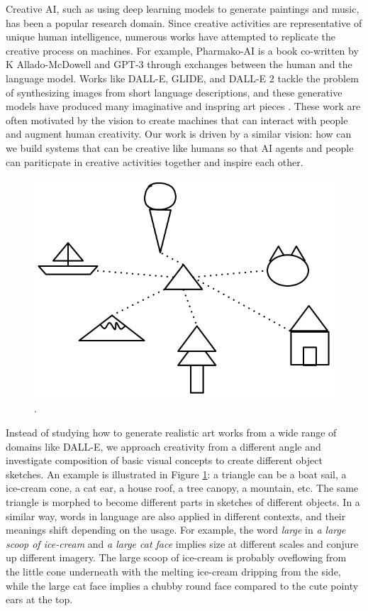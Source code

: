 Creative AI, such as using deep learning models to generate paintings and music, has been a popular research domain. Since creative activities are representative of unique human intelligence, numerous works have attempted to replicate the creative process on machines.
For example, Pharmako-AI \citep{allado-mcdowell_okojie_2020} is a book co-written by K Allado-McDowell and GPT-3 \citep{gpt3} through exchanges between the human and the language model. 
Works like DALL-E, GLIDE, and DALL-E 2 tackle the problem of synthesizing images from short language descriptions, and these generative models have produced many imaginative and inspring art pieces \citep{dallePaper,glidePaper,dalle2Paper}.
These work are often motivated by the vision to create machines that can interact with people and augment human creativity.  
Our work is driven by a similar vision: how can we build systems that can be creative like humans so that AI agents and people can pariticpate in creative activities together and inspire each other. 

\begin{figure}[!htb]
\centering
\includegraphics[width=.3\linewidth]{introduction/sketch_composition.png}  
\caption{.}
\label{introduction.composition}
\end{figure}

Instead of studying how to generate realistic art works from a wide range of domains like DALL-E, we approach creativity from a different angle and investigate composition of basic visual concepts to create different object sketches. 
An example is illustrated in Figure \ref{introduction.composition}: a triangle can be a boat sail, a ice-cream cone, a cat ear, a house roof, a tree canopy, a mountain, etc. The same triangle is morphed to become different parts in sketches of different objects. 
In a similar way, words in language are also applied in different contexts, and their meanings shift depending on the usage. For example, the word \textit{large} in \textit{a large scoop of ice-cream} and \textit{a large cat face} implies size at different scales and conjure up different imagery. The large scoop of ice-cream is probably oveflowing from the little cone underneath with the melting ice-cream dripping from the side, while the large cat face implies a chubby round face compared to the cute pointy ears at the top. 

